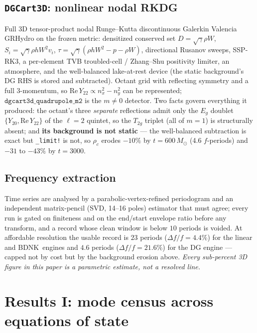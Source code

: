\documentclass[aps,prd,preprint,amsmath,amssymb,nofootinbib,longbibliography]{revtex4-2}
\newcommand{\Msun}{M_\odot}
\newcommand{\BDNK}{BDNK}
\begin{document}
\subsection{\texttt{DGCart3D}: nonlinear nodal RKDG}
Full 3D tensor-product nodal Runge--Kutta discontinuous Galerkin Valencia GRHydro on the frozen
metric: densitized conserved set $D = \sqrt\gamma\rho W$, $S_i = \sqrt\gamma\rho hW^2v_i$,
$\tau = \sqrt\gamma(\rho hW^2 - p - \rho W)$, directional Rusanov sweeps, SSP-RK3, a per-element
TVB troubled-cell / Zhang--Shu positivity limiter, an atmosphere, and the well-balanced
lake-at-rest device (the static background's DG RHS is stored and subtracted). Octant grid with
reflecting symmetry and a full 3-momentum, so $\mathrm{Re}\,Y_{22}\propto n_x^2-n_y^2$ can be
represented; $\texttt{dgcart3d\_quadrupole\_m2}$ is the $m\neq0$ detector. Two facts govern
everything it produced: the octant's three \emph{separate} reflections admit only the $E_g$
doublet $\{Y_{20},\mathrm{Re}\,Y_{22}\}$ of the $\ell=2$ quintet, so the $T_{2g}$ triplet (all of
$m=1$) is structurally absent; and \textbf{its background is not static} --- the well-balanced
subtraction is exact but \texttt{\_limit!} is not, so $\rho_c$ erodes $-10\%$ by $t = 600\,\Msun$
(4.6 $f$-periods) and $-31$ to $-43\%$ by $t=3000$.

\subsection{Frequency extraction}
\label{sec:extract}
Time series are analysed by a parabolic-vertex-refined periodogram and an independent
matrix-pencil (SVD, 14--16 poles) estimator that must agree; every run is gated on finiteness and
on the end/start envelope ratio before any transform, and a record whose clean window is below
$10$ periods is voided. At affordable resolution the usable record is $23$ periods
($\Delta f/f = 4.4\%$) for the linear and \BDNK\ engines and $4.6$ periods ($\Delta f/f = 21.6\%$)
for the DG engine --- capped not by cost but by the background erosion above. \emph{Every
sub-percent 3D figure in this paper is a parametric estimate, not a resolved line.}

\section{Results I: mode census across equations of state}
\end{document}
